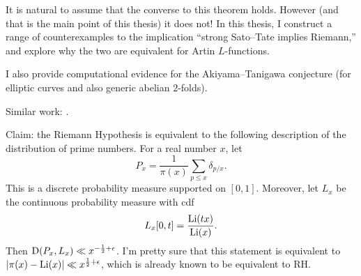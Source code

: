 It is natural to assume that the converse to this theorem holds. However (and 
that is the main point of this thesis) it does not! In this thesis, I construct 
a range of counterexamples to the implication ``strong Sato--Tate implies 
Riemann,'' and explore why the two are equivalent for Artin $L$-functions. 

I also provide computational evidence for the Akiyama--Tanigawa conjecture 
(for elliptic curves and also generic abelian $2$-folds). 

Similar work: \cite{pande-2011}. 


Claim: the Riemann Hypothesis is equivalent to the following description of the 
distribution of prime numbers. For a real number $x$, let 
\[
	P_x = \frac{1}{\pi(x)} \sum_{p\leqslant x} \delta_{p/x} .
\]
This is a discrete probability measure supported on $[0,1]$. Moreover, let 
$L_x$ be the continuous probability measure with cdf 
\[
	L_x[0,t] = \frac{\operatorname{Li}(tx)}{\operatorname{Li}(x)} .
\]
Then $\operatorname{D}(P_x,L_x) \ll x^{-\frac 1 2+\epsilon}$. I'm pretty sure that this 
statement is equivalent to $|\pi(x)-\operatorname{Li}(x)| \ll x^{\frac 1 2+\epsilon}$, which 
is already known to be equivalent to RH. 
